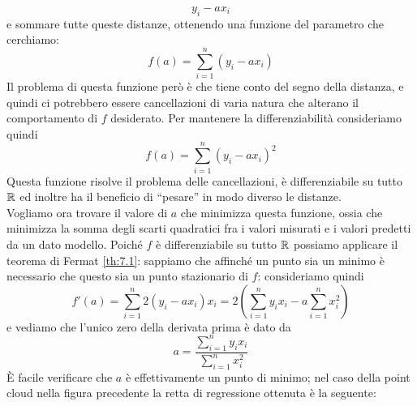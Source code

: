\[
y_i - ax_i
\]
e sommare tutte queste distanze, ottenendo una funzione del parametro che cerchiamo:
\[
f(a) = \sum_{i=1}^n (y_i-ax_i)
\]
Il problema di questa funzione però è che tiene conto del segno della distanza, e quindi ci potrebbero essere cancellazioni di varia natura che alterano il comportamento di $f$ desiderato. Per mantenere la differenziabilità consideriamo quindi
\[
f(a) = \sum_{i=1}^n(y_i-a x_i)^2
\]
Questa funzione risolve il problema delle cancellazioni, è differenziabile su tutto $\amsbb{R}$ ed inoltre ha il beneficio di ``pesare'' in modo diverso le distanze.\\
Vogliamo ora trovare il valore di $a$ che minimizza questa funzione, ossia che minimizza la somma degli scarti quadratici fra i valori misurati e i valori predetti da un dato modello. Poiché $f$ è differenziabile su tutto $\amsbb{R}$ possiamo applicare il teorema di Fermat \ref{th:7.1}: sappiamo che affinché un punto sia un minimo è necessario che questo sia un punto stazionario di $f$: consideriamo quindi
\[
f'(a) = \sum_{i=1}^n 2(y_i-ax_i)x_i = 2\left(\sum_{i=1}^n y_i x_i -a\sum_{i=1}^n x_i^2\right)
\]
e vediamo che l'unico zero della derivata prima è dato da
\[
a = \frac{\sum_{i=1}^n y_i x_i}{\sum_{i=1}^n x_i^2}
\]
\`E facile verificare che $a$ è effettivamente un punto di minimo; nel caso della point cloud nella figura precedente la retta di regressione ottenuta è la seguente:
\begin{center}
\end{center}
\newpage
